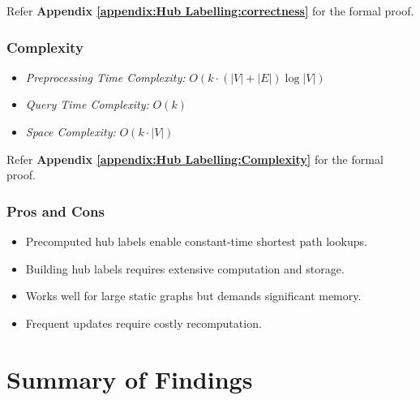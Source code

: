 			
			
			Refer \textbf{Appendix \ref{appendix:Hub Labelling:correctness}} for the formal proof.
			
				\subsubsection{Complexity}
					\begin{itemize}
						\item \textit{Preprocessing Time Complexity:}  $ O(k \cdot (|V| + |E|) \log |V|) $
						\item \textit{Query Time Complexity:}  $ O(k) $
						\item \textit{Space Complexity:}  $ O(k \cdot |V|) $
					\end{itemize} 
	
			Refer \textbf{Appendix \ref{appendix:Hub Labelling:Complexity}} for the formal proof. 
				
				\subsubsection{Pros and Cons}
				\begin{itemize}
					\item Precomputed hub labels enable constant-time shortest path lookups.
					\item Building hub labels requires extensive computation and storage.
					\item Works well for large static graphs but demands significant memory.
					\item Frequent updates require costly recomputation.
				\end{itemize}
										
				




\section{Summary of Findings}

